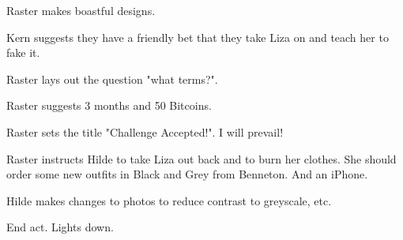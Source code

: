 Raster makes boastful designs.

 Kern suggests they have a friendly bet that they take Liza on and teach her to fake it. 

Raster lays out the question "what terms?".

 Raster suggests 3 months and 50 Bitcoins.  

Raster sets the title "Challenge Accepted!".  I will prevail!

 Raster instructs Hilde to take Liza out back and to burn her clothes.  She should order some new outfits in Black and Grey from Benneton.  And an iPhone.

Hilde makes changes to photos to reduce contrast to greyscale, etc.

End act.  Lights down.
